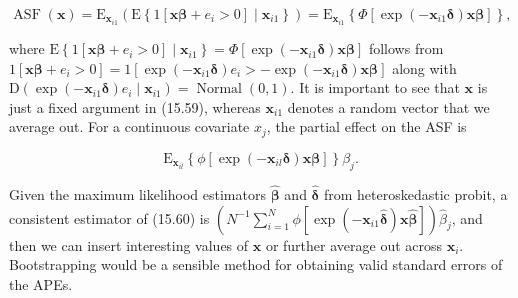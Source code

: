 \documentclass[10pt]{article}
\begin{document}
\begin{equation*}
\operatorname{ASF}(\mathbf{x})=\mathrm{E}_{\mathbf{x}_{i 1}}\left(\mathrm{E}\left\{1\left[\mathbf{x} \boldsymbol{\beta}+e_{i}>0\right] \mid \mathbf{x}_{i 1}\right\}\right)=\mathrm{E}_{\mathbf{x}_{i 1}}\left\{\Phi\left[\exp \left(-\mathbf{x}_{i 1} \boldsymbol{\delta}\right) \mathbf{x} \boldsymbol{\beta}\right]\right\}, \tag{15.59}
\end{equation*}


where $\mathrm{E}\left\{1\left[\mathbf{x} \boldsymbol{\beta}+e_{i}>0\right] \mid \mathbf{x}_{i 1}\right\}=\Phi\left[\exp \left(-\mathbf{x}_{i 1} \boldsymbol{\delta}\right) \mathbf{x} \boldsymbol{\beta}\right]$ follows from $1\left[\mathbf{x} \boldsymbol{\beta}+e_{i}>0\right]= 1\left[\exp \left(-\mathbf{x}_{i 1} \boldsymbol{\delta}\right) e_{i}>-\exp \left(-\mathbf{x}_{i 1} \boldsymbol{\delta}\right) \mathbf{x} \boldsymbol{\beta}\right]$ along with $\mathrm{D}\left(\exp \left(-\mathbf{x}_{i 1} \boldsymbol{\delta}\right) e_{i} \mid \mathbf{x}_{i 1}\right)=\operatorname{Normal}(0,1)$. It is important to see that $\mathbf{x}$ is just a fixed argument in (15.59), whereas $\mathbf{x}_{i 1}$ denotes a random vector that we average out. For a continuous covariate $x_{j}$, the partial effect on the ASF is


\begin{equation*}
\mathrm{E}_{\mathbf{x}_{i l}}\left\{\phi\left[\exp \left(-\mathbf{x}_{i l} \boldsymbol{\delta}\right) \mathbf{x} \boldsymbol{\beta}\right]\right\} \beta_{j} . \tag{15.60}
\end{equation*}


Given the maximum likelihood estimators $\hat{\boldsymbol{\beta}}$ and $\hat{\boldsymbol{\delta}}$ from heteroskedastic probit, a consistent estimator of (15.60) is $\left(N^{-1} \sum_{i=1}^{N} \phi\left[\exp \left(-\mathbf{x}_{i 1} \hat{\boldsymbol{\delta}}\right) \mathbf{x} \hat{\boldsymbol{\beta}}\right]\right) \hat{\beta}_{j}$, and then we can insert interesting values of $\mathbf{x}$ or further average out across $\mathbf{x}_{i}$. Bootstrapping would be a sensible method for obtaining valid standard errors of the APEs.
\end{document}
